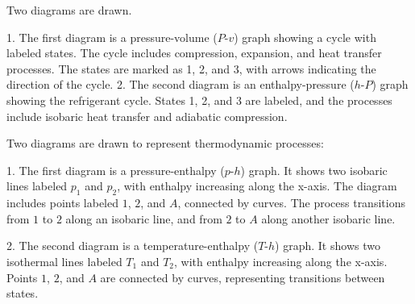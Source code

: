 Two diagrams are drawn.  

1. The first diagram is a pressure-volume (\(P\)-\(v\)) graph showing a cycle with labeled states. The cycle includes compression, expansion, and heat transfer processes. The states are marked as 1, 2, and 3, with arrows indicating the direction of the cycle.  
2. The second diagram is an enthalpy-pressure (\(h\)-\(P\)) graph showing the refrigerant cycle. States 1, 2, and 3 are labeled, and the processes include isobaric heat transfer and adiabatic compression.

Two diagrams are drawn to represent thermodynamic processes:  

1. The first diagram is a pressure-enthalpy (\(p\)-\(h\)) graph. It shows two isobaric lines labeled \(p_1\) and \(p_2\), with enthalpy increasing along the x-axis. The diagram includes points labeled \(1\), \(2\), and \(A\), connected by curves. The process transitions from \(1\) to \(2\) along an isobaric line, and from \(2\) to \(A\) along another isobaric line.  

2. The second diagram is a temperature-enthalpy (\(T\)-\(h\)) graph. It shows two isothermal lines labeled \(T_1\) and \(T_2\), with enthalpy increasing along the x-axis. Points \(1\), \(2\), and \(A\) are connected by curves, representing transitions between states.